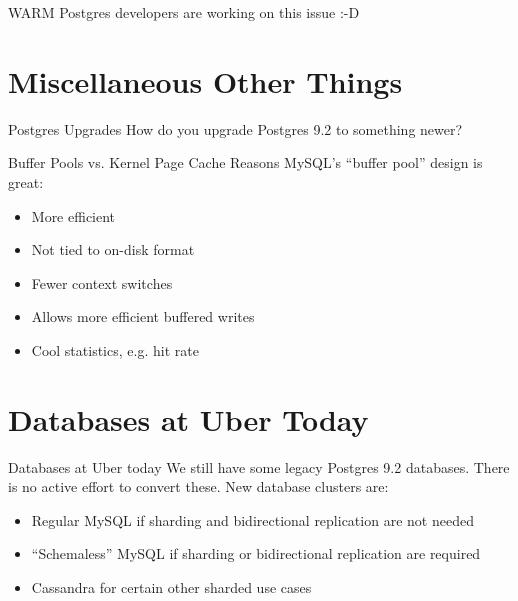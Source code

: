 \documentclass[14pt]{beamer}
\begin{document}
\begin{frame}{WARM}
  Postgres developers are working on this issue :-D
  \newline
  \newline
\end{frame}

\section{Miscellaneous Other Things}

\begin{frame}{Postgres Upgrades}
  How do you upgrade Postgres 9.2 to something newer?
\end{frame}

\begin{frame}{Buffer Pools vs. Kernel Page Cache}
  Reasons MySQL's ``buffer pool'' design is great:
  \begin{itemize}
  \item More efficient
    \item Not tied to on-disk format
  \item Fewer context switches
  \item Allows more efficient buffered writes
  \item Cool statistics, e.g. hit rate
  \end{itemize}
\end{frame}

\section{Databases at Uber Today}

\begin{frame}{Databases at Uber today}
  We still have some legacy Postgres 9.2 databases. There is no active effort to
  convert these.
  \newline
  \newline
  New database clusters are:
  \begin{itemize}
  \item Regular MySQL if sharding and bidirectional replication are not
    needed
  \item ``Schemaless'' MySQL if sharding or bidirectional replication are
    required
    \item Cassandra for certain other sharded use cases
  \end{itemize}
\end{frame}
\end{document}
